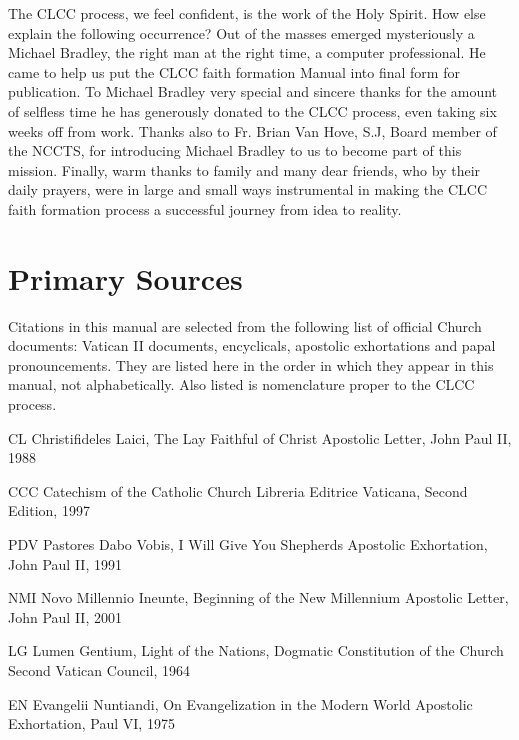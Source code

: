 \documentclass[oneside]{book}
\begin{document}
The CLCC process, we feel confident, is the work of the Holy Spirit. How else
explain the following occurrence? Out of the masses emerged mysteriously a
Michael Bradley, the right man at the right time, a computer professional. He
came to help us put the CLCC faith formation Manual into final form for
publication. To Michael Bradley very special and sincere thanks for the amount
of selfless time he has generously donated to the CLCC process, even taking six
weeks off from work. Thanks also to Fr. Brian Van Hove, S.J, Board member of the
NCCTS, for introducing Michael Bradley to us to become part of this
mission. Finally, warm thanks to family and many dear friends, who by their
daily prayers, were in large and small ways instrumental in making the CLCC
faith formation process a successful journey from idea to reality.


\pagebreak
\tableofcontents


\chapter{Primary Sources}

Citations in this manual are selected from the following list of official Church
documents: Vatican II documents, encyclicals, apostolic exhortations and papal
pronouncements. They are listed here in the order in which they appear in this
manual, not alphabetically. Also listed is nomenclature proper to the CLCC
process.

CL    Christifideles Laici, The Lay Faithful of Christ
    Apostolic Letter, John Paul II, 1988

CCC    Catechism of the Catholic Church
    Libreria Editrice Vaticana, Second Edition, 1997

PDV    Pastores Dabo Vobis, I Will Give You Shepherds
    Apostolic Exhortation, John Paul II, 1991

NMI    Novo Millennio Ineunte, Beginning of the New Millennium
    Apostolic Letter, John Paul II, 2001

LG    Lumen Gentium, Light of the Nations,
    Dogmatic Constitution of the Church
    Second Vatican Council, 1964

EN    Evangelii Nuntiandi, On Evangelization in the Modern World
    Apostolic Exhortation, Paul VI, 1975
\end{document}
